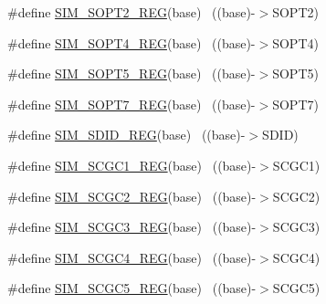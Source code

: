 \begin{DoxyCompactItemize}
\item 
\#define \hyperlink{group___s_i_m___register___accessor___macros_ga94d1a56cbf8d6fbebbd00363ce3cd130}{S\+I\+M\+\_\+\+S\+O\+P\+T2\+\_\+\+R\+EG}(base)                                        ~((base)-\/$>$S\+O\+P\+T2)
\item 
\#define \hyperlink{group___s_i_m___register___accessor___macros_gae47c458103d1381ff7b7f25e45338a64}{S\+I\+M\+\_\+\+S\+O\+P\+T4\+\_\+\+R\+EG}(base)                                        ~((base)-\/$>$S\+O\+P\+T4)
\item 
\#define \hyperlink{group___s_i_m___register___accessor___macros_ga969ab1c02ed173435da69034770b467e}{S\+I\+M\+\_\+\+S\+O\+P\+T5\+\_\+\+R\+EG}(base)                                        ~((base)-\/$>$S\+O\+P\+T5)
\item 
\#define \hyperlink{group___s_i_m___register___accessor___macros_gadd45a86c03d150e9641a354840a71443}{S\+I\+M\+\_\+\+S\+O\+P\+T7\+\_\+\+R\+EG}(base)                                        ~((base)-\/$>$S\+O\+P\+T7)
\item 
\#define \hyperlink{group___s_i_m___register___accessor___macros_gad1b6e604a7db5ffcbe8c3e16d85c8e6b}{S\+I\+M\+\_\+\+S\+D\+I\+D\+\_\+\+R\+EG}(base)                                          ~((base)-\/$>$S\+D\+ID)
\item 
\#define \hyperlink{group___s_i_m___register___accessor___macros_ga5d7eb6d5c186d9fd66456b543145d886}{S\+I\+M\+\_\+\+S\+C\+G\+C1\+\_\+\+R\+EG}(base)                                        ~((base)-\/$>$S\+C\+G\+C1)
\item 
\#define \hyperlink{group___s_i_m___register___accessor___macros_gae8d94cd7e3f87001db2cef56ef232ab3}{S\+I\+M\+\_\+\+S\+C\+G\+C2\+\_\+\+R\+EG}(base)                                        ~((base)-\/$>$S\+C\+G\+C2)
\item 
\#define \hyperlink{group___s_i_m___register___accessor___macros_ga4aa72db302e92ef6729659169881dc61}{S\+I\+M\+\_\+\+S\+C\+G\+C3\+\_\+\+R\+EG}(base)                                        ~((base)-\/$>$S\+C\+G\+C3)
\item 
\#define \hyperlink{group___s_i_m___register___accessor___macros_gab863740854e0a595d5d450e533ded630}{S\+I\+M\+\_\+\+S\+C\+G\+C4\+\_\+\+R\+EG}(base)                                        ~((base)-\/$>$S\+C\+G\+C4)
\item 
\#define \hyperlink{group___s_i_m___register___accessor___macros_gaf51026d4b580eca5948ae938148192e9}{S\+I\+M\+\_\+\+S\+C\+G\+C5\+\_\+\+R\+EG}(base)                                        ~((base)-\/$>$S\+C\+G\+C5)

\end{DoxyCompactItemize}

